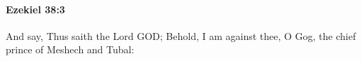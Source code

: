 
		\paragraph{Ezekiel 38:3} %
			\label{EZEKIEL-38-3}

			And say, Thus saith the Lord GOD; Behold, I am against thee, O Gog, the chief prince of Meshech and Tubal:


